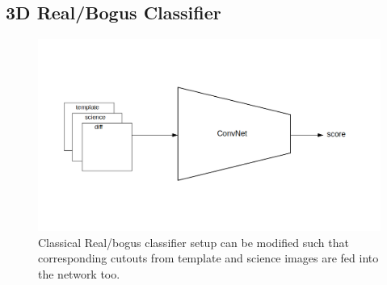 \subsection{3D Real/Bogus Classifier}
\begin{figure}[h]
  \centering
  \includegraphics[width=.8\textwidth]{material/rb-classifier-mod}
  \caption{Classical Real/bogus classifier setup can be modified such that corresponding cutouts from template and science images are fed into the network too.}
  \label{fig:rbdiagram}
\end{figure}










